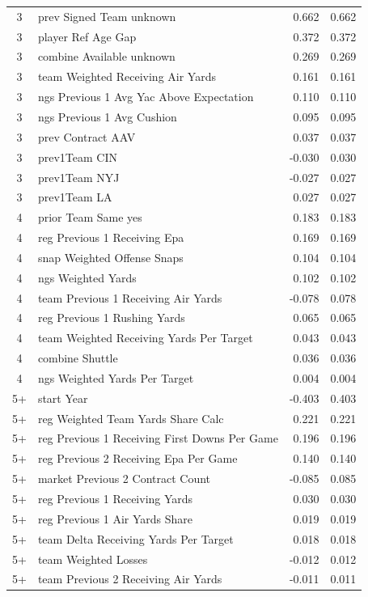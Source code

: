 \documentclass[
  10pt,
]{article}
\begin{document}
\begin{table}[H]
{\begin{tabular}[t]{clrr}
3 & prev Signed Team unknown & 0.662 & 0.662\\
3 & player Ref Age Gap & 0.372 & 0.372\\
3 & combine Available unknown & 0.269 & 0.269\\
3 & team Weighted Receiving Air Yards & 0.161 & 0.161\\
3 & ngs Previous 1 Avg Yac Above Expectation & 0.110 & 0.110\\
3 & ngs Previous 1 Avg Cushion & 0.095 & 0.095\\
3 & prev Contract AAV & 0.037 & 0.037\\
3 & prev1Team CIN & -0.030 & 0.030\\
3 & prev1Team NYJ & -0.027 & 0.027\\
3 & prev1Team LA & 0.027 & 0.027\\
4 & prior Team Same yes & 0.183 & 0.183\\
4 & reg Previous 1 Receiving Epa & 0.169 & 0.169\\
4 & snap Weighted Offense Snaps & 0.104 & 0.104\\
4 & ngs Weighted Yards & 0.102 & 0.102\\
4 & team Previous 1 Receiving Air Yards & -0.078 & 0.078\\
4 & reg Previous 1 Rushing Yards & 0.065 & 0.065\\
4 & team Weighted Receiving Yards Per Target & 0.043 & 0.043\\
4 & combine Shuttle & 0.036 & 0.036\\
4 & ngs Weighted Yards Per Target & 0.004 & 0.004\\
5+ & start Year & -0.403 & 0.403\\
5+ & reg Weighted Team Yards Share Calc & 0.221 & 0.221\\
5+ & reg Previous 1 Receiving First Downs Per Game & 0.196 & 0.196\\
5+ & reg Previous 2 Receiving Epa Per Game & 0.140 & 0.140\\
5+ & market Previous 2 Contract Count & -0.085 & 0.085\\
5+ & reg Previous 1 Receiving Yards & 0.030 & 0.030\\
5+ & reg Previous 1 Air Yards Share & 0.019 & 0.019\\
5+ & team Delta Receiving Yards Per Target & 0.018 & 0.018\\
5+ & team Weighted Losses & -0.012 & 0.012\\
5+ & team Previous 2 Receiving Air Yards & -0.011 & 0.011\\
\bottomrule
\end{tabular}}
\end{table}
\end{document}
